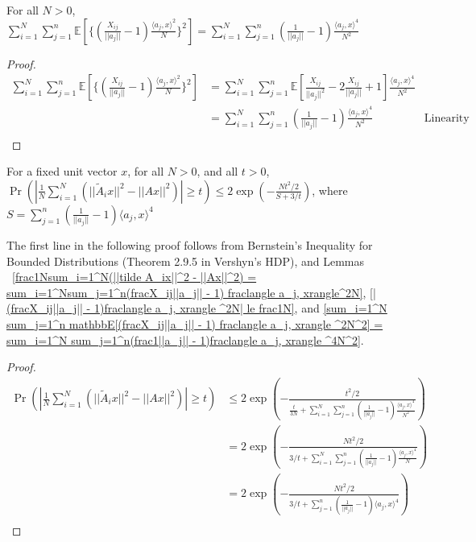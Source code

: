 \begin{lemma}
\label{sum_i=1^N sum_j=1^n mathbbE[(fracX_ij||a_j|| - 1) fraclangle a_j, xrangle ^2N^2] = sum_i=1^N sum_j=1^n(frac1||a_j|| - 1)fraclangle a_j, xrangle ^4N^2}
    For all $N > 0$, $\sum_{i=1}^N \sum_{j=1}^n \mathbb{E}[\{(\frac{X_{ij}}{||a_j||} - 1) \frac{\langle a_j, x\rangle ^2}{N}\}^2] = \sum_{i=1}^N \sum_{j=1}^n(\frac{1}{||a_j||} - 1)\frac{\langle a_j, x\rangle ^4}{N^2}$
\end{lemma}

\begin{proof}
    \begin{align*}
        \sum_{i=1}^N \sum_{j=1}^n \mathbb{E}[\{(\frac{X_{ij}}{||a_j||} - 1) \frac{\langle a_j, x\rangle ^2}{N}\}^2] &= \sum_{i=1}^N \sum_{j=1}^n \mathbb{E}[\frac{X_{ij}}{||a_j||^2} - 2\frac{X_{ij}}{||a_j||}+ 1]  \frac{\langle a_j, x\rangle ^4}{N^2}\\
        &= \sum_{i=1}^N \sum_{j=1}^n (\frac{1}{||a_j||} - 1)  \frac{\langle a_j, x\rangle ^4}{N^2} & \text{Linearity}\\
    \end{align*}
\end{proof}

\begin{lemma}
\label{Pr(|frac1Nsum_i=1^N(||tilde A_ix||^2 - ||Ax||^2)| ge t) le 2 expleft(- fracNt^2/2S + 3/tright)}
    For a fixed unit vector $x$, for all $N > 0$, and all $t > 0$, $\Pr(|\frac{1}{N}\sum_{i=1}^N(||\tilde A_ix||^2 - ||Ax||^2)| \ge t) \le 2 \exp\left(- \frac{Nt^2/2}{S + 3/t}\right)$, where $S = \sum_{j=1}^n (\frac{1}{||a_j||} - 1)  \langle a_j, x\rangle ^4$
\end{lemma}

The first line in the following proof follows from Bernstein's Inequality for Bounded Distributions (Theorem 2.9.5 in Vershyn's HDP), and Lemmas ~\ref{frac1Nsum_i=1^N(||tilde A_ix||^2 - ||Ax||^2) = sum_i=1^Nsum_j=1^n(fracX_ij||a_j|| - 1) fraclangle a_j, xrangle^2N}, \ref{|(fracX_ij||a_j|| - 1)fraclangle a_j, xrangle ^2N| le frac1N}, and \ref{sum_i=1^N sum_j=1^n mathbbE[(fracX_ij||a_j|| - 1) fraclangle a_j, xrangle ^2N^2] = sum_i=1^N sum_j=1^n(frac1||a_j|| - 1)fraclangle a_j, xrangle ^4N^2}.

\begin{proof}
    \begin{align*}
        \Pr(|\frac{1}{N}\sum_{i=1}^N(||\tilde A_ix||^2 - ||Ax||^2)| \ge t) &\le 2 \exp\left(- \frac{t^2/2}{\frac{t}{3N} + \sum_{i=1}^N \sum_{j=1}^n (\frac{1}{||a_j||} - 1)  \frac{\langle a_j, x\rangle^4}{N^2}}\right)\\
        &= 2 \exp\left(- \frac{Nt^2/2}{3/t + \sum_{i=1}^N \sum_{j=1}^n (\frac{1}{||a_j||} - 1)  \frac{\langle a_j, x\rangle ^4}{N}}\right)\\
        &= 2 \exp\left(- \frac{Nt^2/2}{3/t + \sum_{j=1}^n (\frac{1}{||a_j||} - 1)  \langle a_j, x\rangle ^4}\right)\\
    \end{align*}
\end{proof}

